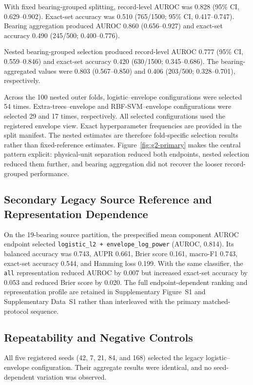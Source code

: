 \documentclass[machines,article,submit,oneauthor,pdftex]{Definitions/mdpi}
\begin{document}
With fixed bearing-grouped splitting, record-level AUROC was 0.828 (95\% CI, 0.629--0.902). Exact-set accuracy was 0.510 (765/1500; 95\% CI, 0.417--0.747). Bearing aggregation produced AUROC 0.860 (0.656--0.927) and exact-set accuracy 0.490 (245/500; 0.400--0.776).

Nested bearing-grouped selection produced record-level AUROC 0.777 (95\% CI, 0.559--0.846) and exact-set accuracy 0.420 (630/1500; 0.345--0.686). The bearing-aggregated values were 0.803 (0.567--0.850) and 0.406 (203/500; 0.328--0.701), respectively.

Across the 100 nested outer folds, logistic--envelope configurations were selected 54 times. Extra-trees--envelope and RBF-SVM--envelope configurations were selected 29 and 17 times, respectively. All selected configurations used the registered envelope view. Exact hyperparameter frequencies are provided in the split manifest. The nested estimates are therefore fold-specific selection results rather than fixed-reference estimates. Figure~\ref{fig:g2-primary} makes the central pattern explicit: physical-unit separation reduced both endpoints, nested selection reduced them further, and bearing aggregation did not recover the looser record-grouped performance.

\subsection{Secondary Legacy Source Reference and Representation Dependence}

On the 19-bearing source partition, the prespecified mean component AUROC endpoint selected \texttt{logistic\_l2 + envelope\_log\_power} (AUROC, 0.814). Its balanced accuracy was 0.743, AUPR 0.661, Brier score 0.161, macro-F1 0.743, exact-set accuracy 0.544, and Hamming loss 0.199. With the same classifier, the \texttt{all} representation reduced AUROC by 0.007 but increased exact-set accuracy by 0.053 and reduced Brier score by 0.020. The full endpoint-dependent ranking and representation profile are retained in Supplementary Figure~S1 and Supplementary Data~S1 rather than interleaved with the primary matched-protocol sequence.

\subsection{Repeatability and Negative Controls}

All five registered seeds (42, 7, 21, 84, and 168) selected the legacy logistic--envelope configuration. Their aggregate results were identical, and no seed-dependent variation was observed.
\end{document}
